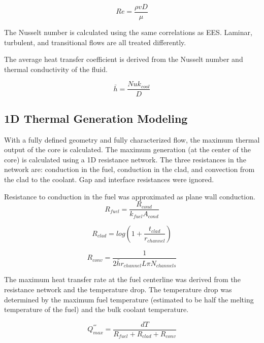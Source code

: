 \begin{equation}
    Re = \frac{\rho v D}{\mu}
\end{equation}

The Nusselt number is calculated using the same correlations as EES. Laminar,
turbulent, and transitional flows are all treated differently.

The average heat transfer coefficient is derived from the Nusselt number and
thermal conductivity of the fluid.

\begin{equation}
    \bar{h} = \frac{Nu k_{cool}}{D}
\end{equation}

\subsection{1D Thermal Generation Modeling}

With a fully defined geometry and fully characterized flow, the maximum thermal
output of the core is calculated. The maximum generation (at the center of the
core) is calculated using a 1D resistance network. The three resistances in the
network are: conduction in the fuel, conduction in the clad, and convection from
the clad to the coolant. Gap and interface resistances were ignored.

Resistance to conduction in the fuel was approximated as plane wall conduction.
\begin{equation}
    R_{fuel} =  \frac{R_{cond}}{k_{fuel}A_{cond}}
\end{equation}

\begin{equation}
    R_{clad} = log(1+\frac{t_{clad}}{r_{channel}})
\end{equation}

\begin{equation}
    R_{conv} = \frac{1}{2\bar{h}r_{channel}L\pi N_{channels}}
\end{equation}

The maximum heat transfer rate at the fuel centerline was derived from the
resistance network and the temperature drop. The temperature drop was determined
by the maximum fuel temperature (estimated to be half the melting temperature of
the fuel) and the bulk coolant temperature.

\begin{equation}
    Q^{'''}_{max} = \frac{dT}{R_{fuel} + R_{clad} + R_{conv}}
\end{equation}

